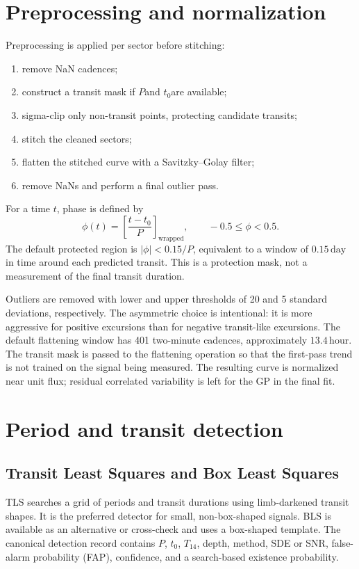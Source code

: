 \documentclass[12pt,a4paper,oneside]{report}
\newcommand{\SI}[2]{\ensuremath{#1\,\mathrm{#2}}}
\newcommand{\Porb}{\ensuremath{P}}
\newcommand{\Tfourteen}{\ensuremath{T_{14}}}
\newcommand{\tzero}{\ensuremath{t_{0}}}
\begin{document}
\section{Preprocessing and normalization}
Preprocessing is applied per sector before stitching:
\begin{enumerate}
  \item remove NaN cadences;
  \item construct a transit mask if \Porb and \tzero are available;
  \item sigma-clip only non-transit points, protecting candidate transits;
  \item stitch the cleaned sectors;
  \item flatten the stitched curve with a Savitzky--Golay filter;
  \item remove NaNs and perform a final outlier pass.
\end{enumerate}
For a time \(t\), phase is defined by
\begin{equation}
  \phi(t)=\left[\frac{t-\tzero}{\Porb}\right]_{\mathrm{wrapped}},
  \qquad -0.5\leq \phi < 0.5.
\end{equation}
The default protected region is \(|\phi|<0.15/\Porb\), equivalent to a
window of \SI{0.15}{day} in time around each predicted transit. This is a
protection mask, not a measurement of the final transit duration.

Outliers are removed with lower and upper thresholds of 20 and 5 standard
deviations, respectively. The asymmetric choice is intentional: it is more
aggressive for positive excursions than for negative transit-like excursions.
The default flattening window has 401 two-minute cadences, approximately
\SI{13.4}{hour}. The transit mask is passed to the flattening operation so that
the first-pass trend is not trained on the signal being measured. The resulting
curve is normalized near unit flux; residual correlated variability is left for
the GP in the final fit.

\section{Period and transit detection}
\subsection{Transit Least Squares and Box Least Squares}
TLS searches a grid of periods and transit durations using limb-darkened transit
shapes. It is the preferred detector for small, non-box-shaped signals. BLS is
available as an alternative or cross-check and uses a box-shaped template. The
canonical detection record contains \Porb, \tzero, \Tfourteen, depth, method,
SDE or SNR, false-alarm probability (FAP), confidence, and a search-based
existence probability.
\end{document}
